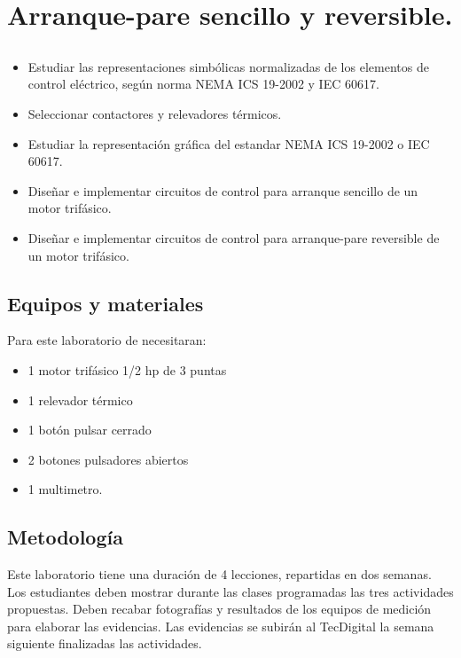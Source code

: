 \chapter{Arranque-pare sencillo y reversible.}


\section{\obj}
\capacidad
\begin{itemize}
    \item Estudiar  las representaciones simbólicas normalizadas de los elementos de control eléctrico, según norma NEMA ICS 19-2002 y IEC 60617.
    \item Seleccionar contactores y relevadores térmicos.
    \item Estudiar la representación gráfica del estandar NEMA ICS 19-2002 o IEC 60617. 
    \item Diseñar e implementar circuitos de control para arranque sencillo de un motor trifásico.
    \item Diseñar e implementar circuitos de control para arranque-pare reversible de un  motor trifásico.
\end{itemize} 

 
\section{Equipos y materiales}
Para este laboratorio de necesitaran:
\begin{itemize}
    \item 1 motor trifásico 1/2 hp de 3 puntas
	\item 1 relevador térmico
	\item 1 botón pulsar cerrado
	\item 2 botones pulsadores abiertos
	\item 1 multimetro.
\end{itemize}

\section{Metodología}

Este laboratorio tiene una duración de 4 lecciones, repartidas en dos semanas. Los estudiantes deben mostrar durante las clases programadas las tres actividades propuestas. Deben recabar fotografías y resultados de los equipos de medición para elaborar las evidencias. Las evidencias se subirán al TecDigital la semana siguiente finalizadas las actividades.

